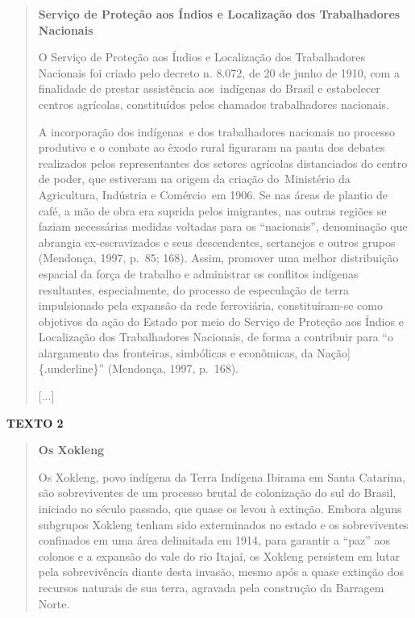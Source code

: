 \begin{quote}
\textbf{Serviço de Proteção aos Índios e Localização dos Trabalhadores Nacionais}

O Serviço de Proteção aos Índios e Localização dos Trabalhadores
Nacionais foi criado pelo decreto n. 8.072, de 20 de junho de 1910, com
a finalidade de prestar assistência aos~indígenas do Brasil e
estabelecer centros agrícolas, constituídos pelos chamados trabalhadores
nacionais.

A incorporação dos indígenas~e dos trabalhadores nacionais no processo
produtivo e o combate ao êxodo rural figuraram na pauta dos debates
realizados pelos representantes dos setores agrícolas distanciados do
centro de poder, que estiveram na origem da criação do~Ministério da
Agricultura, Indústria e Comércio~em 1906. Se nas áreas de plantio de
café, a mão de obra era suprida pelos imigrantes, nas outras regiões se
faziam necessárias medidas voltadas para os ``nacionais'', denominação
que abrangia ex-escravizados e seus descendentes, sertanejos e outros
grupos (Mendonça, 1997, p.~85; 168). Assim, promover uma melhor
distribuição espacial da força de trabalho e administrar os conflitos
indígenas resultantes, especialmente, do processo de especulação de
terra impulsionado pela expansão da rede ferroviária, constituíram-se
como objetivos da ação do Estado por meio do Serviço de Proteção aos
Índios e Localização dos Trabalhadores Nacionais, de forma a contribuir
para ``o alargamento das fronteiras, simbólicas e econômicas, da
Nação{]}\{.underline\}'' (Mendonça, 1997, p.~168).

{[}...{]}

\end{quote}

\textbf{TEXTO 2}

\begin{quote}
\textbf{Os Xokleng}

Os Xokleng, povo indígena da Terra Indígena Ibirama em Santa Catarina,
são sobreviventes de um processo brutal de colonização do sul do Brasil,
iniciado no século passado, que quase os levou à extinção. Embora alguns
subgrupos Xokleng tenham sido exterminados no estado e os sobreviventes
confinados em uma área delimitada em 1914, para garantir a ``paz'' aos
colonos e a expansão do vale do rio Itajaí, os Xokleng persistem em
lutar pela sobrevivência diante desta invasão, mesmo após a quase
extinção dos recursos naturais de sua terra, agravada pela construção da
Barragem Norte.

\end{quote}

